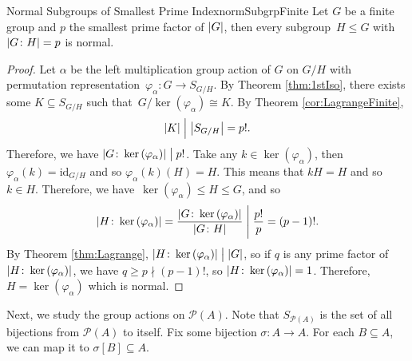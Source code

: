\documentclass[math]{amznotes}
\theoremstyle{remark}
\newcommand{\kernel}[1]{\ker\left(#1\right)}
\newcommand{\0}{\mathbf{0}}
\newcommand{\1}{\mathbf{1}}
\begin{document}
\begin{probox}{Normal Subgroups of Smallest Prime Index}{normSubgrpFinite}
    Let $G$ be a finite group and $p$ the smallest prime factor of ${\left\lvert {G} \right\rvert}$, then every subgroup~$H \leq G$ with ${\left\lvert {G \colon H} \right\rvert} = p$ is normal.
    \tcblower
    \begin{proof}
        Let $\alpha$ be the left multiplication group action of $G$ on $G \slash H$ with permutation representation~$\varphi_{\alpha} \colon G \to S_{G \slash H}$. By Theorem \ref{thm:1stIso}, there exists some $K \subseteq S_{G \slash H}$ such that~$G \slash \kernel{\varphi_{\alpha}} \cong K$. By Theorem \ref{cor:LagrangeFinite}, 
        \begin{equation*}
            {\left\lvert {K} \right\rvert} \Bigm\vert {\left\lvert {S_{G \slash H}} \right\rvert} = p!.
        \end{equation*}
        Therefore, we have $\abs{G \colon \kernel{\varphi_{\alpha}}} \bigm\vert p!$. Take any $k \in \kernel{\varphi_{\alpha}}$, then $\varphi_{\alpha}\left(k\right) = \mathrm{id}_{G \slash H}$ and so $\varphi_{\alpha}\left(k\right)\left(H\right) = H$. This means that $kH = H$ and so $k \in H$. Therefore, we have~$\kernel{\varphi_{\alpha}} \leq H \leq G$, and so 
        \begin{equation*}
            \abs{H \colon \kernel{\varphi_{\alpha}}} = \frac{\abs{G \colon \kernel{\varphi_{\alpha}}}}{\abs{G \colon H}} \Biggm\vert \frac{p!}{p} = \left(p - 1\right)!.
        \end{equation*}
        By Theorem \ref{thm:Lagrange}, $\abs{H \colon \kernel{\varphi_{\alpha}}} \bigm\vert \abs{G}$, so if $q$ is any prime factor of $\abs{H \colon \kernel{\varphi_{\alpha}}}$, we have $q \geq p \nmid \left(p - 1\right)!$, so $\abs{H \colon \kernel{\varphi_{\alpha}}} = 1$. Therefore, $H = \kernel{\varphi_{\alpha}}$ which is normal.
    \end{proof}
\end{probox} 
Next, we study the group actions on $\mathcal{P}\left(A\right)$. Note that $S_{\mathcal{P}\left(A\right)}$ is the set of all bijections from $\mathcal{P}\left(A\right)$ to itself. Fix some bijection $\sigma \colon A \to A$. For each $B \subseteq A$, we can map it to $\sigma\left[B\right] \subseteq A$.
\end{document}
